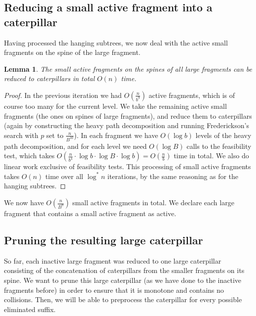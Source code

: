 \documentclass[11pt,a4paper]{article}
\newtheorem{lemma}{Lemma}
\theoremstyle{definition}
\theoremstyle{remark}
\begin{document}
\subsection{Reducing a small active fragment into a caterpillar}\label{section:lemma2}
Having processed the hanging subtrees, we now deal with the active small fragments on the spine of the large fragment. 

\begin{lemma}\label{lemma2}
	The small active fragments on the spines of all large fragments can be reduced to caterpillars in total $O(n)$ time. 
\end{lemma}
\begin{proof}

In the previous iteration we had $O(\frac{n}{b^9})$ active fragments, which is of course
too many for the current level. We take the remaining active small fragments (the ones on spines of large 
fragments), and reduce them to caterpillars (again by constructing the heavy path decomposition and running
Frederickson's search with $p$ set to $\frac{n}{B^{10}}$). In each fragment we have $O(\log b)$ levels of the heavy
path decomposition, and for each level we need $O(\log B)$ calls to the feasibility test, which takes
$O(\frac{n}{b^4} \cdot \log b \cdot \log B \cdot \log b) = O(\frac{n}{b})$ time in total. We also do linear
work exclusive of feasibility tests. This processing of small active fragments takes $O(n)$ time over all
$\log ^*n$ iterations, by the same reasoning as for the hanging subtrees.
\end{proof}


We now have $O(\frac{n}{B^9})$ small active fragments in total. We declare each large fragment that contains a small active fragment as active. 

\subsection{Pruning the resulting large caterpillar}\label{section:lemma3}
So far, each inactive large fragment was reduced to one large caterpillar consisting of the concatenation of caterpillars from the smaller fragments on its spine. We want
to prune this large caterpillar (as we have done to the inactive fragments before) in order to ensure
that it is monotone and contains no collisions.   Then, we will
be able to preprocess the caterpillar for every possible eliminated suffix.
\end{document}
